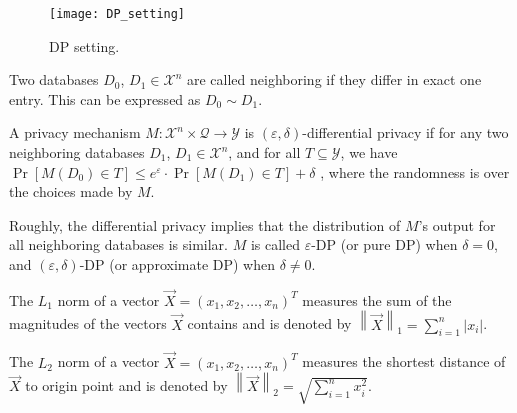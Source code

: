 \begin{figure}[htbp]
    \texttt{[image: DP\_setting]}
    \centering
    \caption{DP setting.}
    \label{img:DPsetting}
\end{figure}
\FloatBarrier

\begin{definition}
    Two databases $D_{0}$, $D_{1}\in \mathcal{X}^{n}$  are called neighboring if they differ in exact one entry. This can be expressed as $D_{0}\sim D_{1}$.
\end{definition}

\begin{definition}
    A privacy mechanism $M:\mathcal{X}^{n}\times \mathcal{Q}\rightarrow \mathcal{Y}$ is $\left( \varepsilon ,\delta \right)$-differential privacy if for any two neighboring databases $D_{1}$, $D_{1}\in \mathcal{X}^{n}$, and for all $T\subseteq \mathcal{Y}$, we have $\Pr \left[ M\left( D_{0}\right) \in T\right] \leq e^{\varepsilon}\cdot \Pr \left[ M\left( D_{1}\right) \in T\right] +\delta$ ,
    where the randomness is over the choices made by $M$.
    \label{def:DP}
\end{definition}

Roughly, the differential privacy implies that the distribution of $M$'s output for all neighboring databases is similar. $M$ is called $\varepsilon$-DP (or pure DP) when $\delta = 0$, and $\left(\varepsilon,\delta\right)$-DP (or approximate DP) when $\delta \neq 0$.

\begin{definition}[$L_{1}$ norm]
    The $L_{1}$ norm of a vector $\vec{X}=\left(x_1, x_2, \ldots,x_n \right)^{T}$ measures the sum of the magnitudes of the vectors $\vec{X}$ contains and is denoted by $\left\|\vec{X}\right\|_{1}=\sum ^{n}_{i=1}\left| x_{i}\right| $.
\end{definition}

\begin{definition}[$L_{2}$ norm]
    The $L_{2}$ norm of a vector $\vec{X}=\left(x_1, x_2, \ldots,x_n \right)^{T}$ measures the shortest distance of $\vec{X}$ to origin point and is denoted by $\left\|\vec{X}\right\|_{2}=\sqrt{\sum ^{n}_{i=1}x_{i}^{2}}$.
\end{definition}

